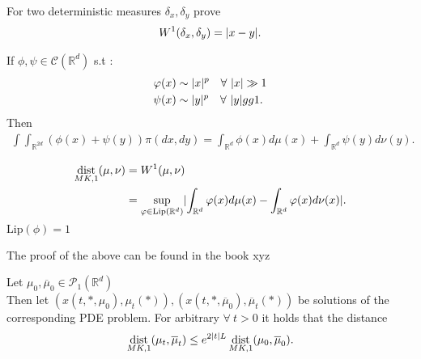 \begin{exercise}
 For two deterministic measures $\delta_x,\delta_y$ prove 
 \begin{align*}
  W^{1}(\delta_x,\delta_y)  = \lvert x - y\rvert
 .\end{align*}
\end{exercise}
\begin{remark}
 If $\phi , \psi \in  \mathcal{C}(\mathbb{R}^{d} )$  s.t :
 \begin{align*}
   \varphi(x) &\sim  \lvert x\rvert^{p}  \quad \forall \ \lvert x\rvert \gg 1 \\
   \psi(x) &\sim  \lvert y\rvert^{p}  \quad \forall \ \lvert y\rvert gg 1
 .\end{align*}
 Then 
 \begin{align*}
   \int \int_{\mathbb{R}^{2d} } (\phi(x) + \psi(y)) \pi(dx,dy) = \int_{\mathbb{R}^{d } } \phi(x) d\mu(x) + \int_{\mathbb{R}^{d} } \psi(y) d\nu(y)
 . \end{align*}
\end{remark}
\begin{corollary}
 \begin{align*}
   \operatorname*{dist}_{MK,1}(\mu ,\nu ) &= W^{1}(\mu ,\nu )  \\
                           &= \sup_{\varphi \in  \text{Lip}(\mathbb{R}^{d} )} \lvert\int_{\mathbb{R}^{d} } \varphi(x) d\mu(x) - \int_{\mathbb{R}^{d} } \varphi(x) d\nu(x)\rvert
 .\end{align*} 
 $\text{Lip}(\phi ) = 1$
\end{corollary}
The proof of the above can be found in the book xyz
\begin{theorem}
  Let $\mu_{0},\overline{\mu }_0  \in  \mathcal{P}_1(\mathbb{R}^{d } )$\\
  Then let $(x(t,*,\mu_0),\mu_t(*)),(x(t,*,\overline{\mu }_0 ),\overline{\mu }_t(*) )$ be solutions of 
  the corresponding PDE problem. For arbitrary $\forall\ t >0$ it holds that the distance 
  \begin{align*}
    \operatorname*{dist}_{MK,1}(\mu_t,\overline{\mu }_t ) \le e^{2\lvert t\rvert L} \operatorname*{dist}_{MK,1}(\mu_0,\overline{\mu }_0 )
  .\end{align*} 
\end{theorem}
